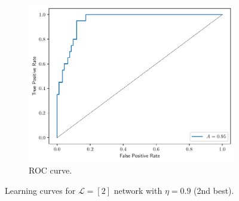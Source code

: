 \documentclass[conference]{IEEEtran}
\theoremstyle{definition}
\theoremstyle{remark}
\theoremstyle{remark}
\begin{document}
\begin{figure}
\begin{subfigure}[b]{0.32\textwidth}
    \centering \includegraphics[width=\textwidth]{figs/2-0.9-roc.pdf}
    \caption{ROC curve.}
  \end{subfigure}
  \caption{Learning curves for $\mathcal{L}=[2]$ network with $\eta=0.9$ (2nd
    best).}
  \label{fig:NN-2best}
\end{figure}
\end{document}

